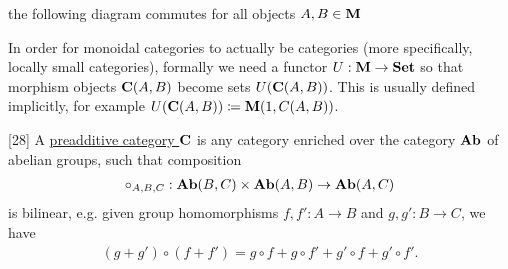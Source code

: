 \begin{definition}
\begin{defenum}
    \item the following diagram commutes for all objects $A, B \in \operatorname{\mathbf{M}}$

    \begin{center}
    \end{center}
  \end{defenum}

  In order for monoidal categories to actually be categories (more specifically, locally small categories), formally we need a functor $U: \operatorname{\mathbf{M}} \to \operatorname{\mathbf{Set}}$ so that morphism objects $\operatorname{\mathbf{C}}(A, B)$ become sets $U(\operatorname{\mathbf{C}}(A, B))$. This is usually defined implicitly, for example $U(\operatorname{\mathbf{C}}(A, B)) \coloneqq \operatorname{\mathbf{M}}(1, C(A, B))$.
\end{definition}

\begin{definition}\label{def:preadditive_category}\cite{MacLane1994}[28]
  A \uline{preadditive category $\operatorname{\mathbf{C}}$} is any category enriched over the category $\operatorname{\mathbf{Ab}}$ of abelian groups, such that composition
  \begin{align*}
    \circ_{A,B,C}: \operatorname{\mathbf{Ab}}(B, C) \times \operatorname{\mathbf{Ab}}(A, B) \to \operatorname{\mathbf{Ab}}(A, C)
  \end{align*}
  is bilinear, e.g. given group homomorphisms $f, f': A \to B$ and $g, g': B \to C$, we have
  \begin{align*}
    (g + g') \circ (f + f') = g \circ f + g \circ f' + g' \circ f + g' \circ f'.
  \end{align*}
\end{definition}

